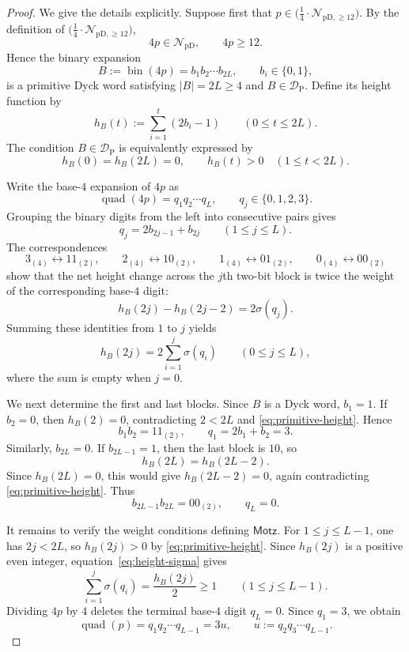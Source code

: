 \documentclass[12pt]{article}
\theoremstyle{plain}
\theoremstyle{definition}
\theoremstyle{plain}
\newcommand{\NpD}{\mathcal{N}_{\mathrm{pD}}}
\newcommand{\DP}{\mathcal{D}_{\mathrm{P}}}
\newcommand{\Pset}{%
  \bigl(\tfrac{1}{4}\cdot\mathcal{N}_{\mathrm{pD},\geq 12}\bigr)%
}
\begin{document}
\begin{proof}
We give the details explicitly.  Suppose first that $p\in\Pset$.  By the definition of $\Pset$,
\[
 4p\in\NpD,\qquad 4p\geq12.
\]
Hence the binary expansion
\[
 B:=\operatorname{bin}(4p)=b_1b_2\cdots b_{2L},
 \qquad b_i\in\{0,1\},
\]
is a primitive Dyck word satisfying $|B|=2L\geq4$ and $B\in\DP$.
Define its height function by
\[
 h_B(t):=\sum_{i=1}^{t}(2b_i-1)
 \qquad(0\leq t\leq2L).
\]
The condition $B\in\DP$ is equivalently expressed by
\begin{equation}\label{eq:primitive-height}
 h_B(0)=h_B(2L)=0,
 \qquad
 h_B(t)>0\quad(1\leq t<2L).
\end{equation}

Write the base-$4$ expansion of $4p$ as
\[
 \operatorname{quad}(4p)=q_1q_2\cdots q_L,
 \qquad q_j\in\{0,1,2,3\}.
\]
Grouping the binary digits from the left into consecutive pairs gives
\[
 q_j=2b_{2j-1}+b_{2j}
 \qquad(1\leq j\leq L).
\]
The correspondences
\[
 3_{(4)}\longleftrightarrow11_{(2)},\qquad
 2_{(4)}\longleftrightarrow10_{(2)},\qquad
 1_{(4)}\longleftrightarrow01_{(2)},\qquad
 0_{(4)}\longleftrightarrow00_{(2)}
\]
show that the net height change across the $j$th two-bit block is twice
the weight of the corresponding base-$4$ digit:
\[
 h_B(2j)-h_B(2j-2)=2\sigma(q_j).
\]
Summing these identities from $1$ to $j$ yields
\begin{equation}\label{eq:height-sigma}
 h_B(2j)=2\sum_{i=1}^{j}\sigma(q_i)
 \qquad(0\leq j\leq L),
\end{equation}
where the sum is empty when $j=0$.

We next determine the first and last blocks.  Since $B$ is a Dyck word,
$b_1=1$.  If $b_2=0$, then $h_B(2)=0$, contradicting
$2<2L$ and \eqref{eq:primitive-height}.  Hence
\[
 b_1b_2=11_{(2)},
 \qquad
 q_1=2b_1+b_2=3.
\]
Similarly, $b_{2L}=0$.  If $b_{2L-1}=1$, then the last block is $10$, so
\[
 h_B(2L)=h_B(2L-2).
\]
Since $h_B(2L)=0$, this would give $h_B(2L-2)=0$, again contradicting
\eqref{eq:primitive-height}.  Thus
\[
 b_{2L-1}b_{2L}=00_{(2)},
 \qquad
 q_L=0.
\]

It remains to verify the weight conditions defining $\mathsf{Motz}$.
For $1\leq j\leq L-1$, one has $2j<2L$, so
$h_B(2j)>0$ by \eqref{eq:primitive-height}.  Since $h_B(2j)$ is a positive
even integer, equation~\eqref{eq:height-sigma} gives
\begin{equation}\label{eq:prefix-height}
 \sum_{i=1}^{j}\sigma(q_i)
 =\frac{h_B(2j)}{2}
 \geq1
 \qquad(1\leq j\leq L-1).
\end{equation}
Dividing $4p$ by $4$ deletes the terminal base-$4$ digit $q_L=0$.
Since $q_1=3$, we obtain
\[
 \operatorname{quad}(p)=q_1q_2\cdots q_{L-1}=3u,
 \qquad
 u:=q_2q_3\cdots q_{L-1}.
\]


\end{proof}
\end{document}
